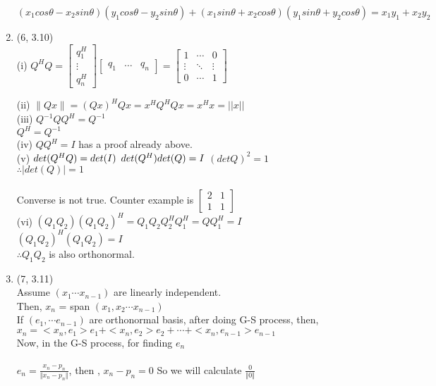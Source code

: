 \documentclass[letterpaper,12pt]{article}
\theoremstyle{definition}
\begin{document}
\begin{enumerate}
		$(x_{1}cos\theta - x_{2}sin\theta)(y_{1}cos\theta - y_{2}sin\theta)  + (x_{1}sin\theta + x_{2}cos\theta)(y_{1}sin\theta + y_{2}cos\theta) = x_{1}y_{1} + x_{2}y_{2}$




	\item (6, 3.10)\\ 
		(i) $ Q^{H}Q = \begin{bmatrix}q_{1}^{H} \\ \vdots \\ q_{n}^{H}\end{bmatrix}
					\begin{bmatrix}q_{1} & \hdots & q_{n}\end{bmatrix} = 
\begin{bmatrix}
1 & \cdots & 0 \\
\vdots & \ddots & \vdots \\
0 & \cdots & 1
\end{bmatrix}
		$
		
		(ii) $\| Qx\| = (Qx)^{H}Qx = x^{H}Q^{H}Qx = x^{H}x = || x || $ \\
	        (iii) $Q^{-1}QQ^{H} = Q^{-1}$  \\ $Q^{H}=Q^{-1}$ \\
		(iv) $QQ^{H} = I$ has a proof already above. \\
		(v) $det(Q^{H}Q) = det(I) \\$ $det(Q^{H})det(Q) = I \\$ $(detQ)^2=1$ \\ $\therefore \left|det(Q)\right| = 1  $ \\ \\
		Converse is not true. Counter example is $\begin{bmatrix}
			2 & 1 \\
			1 & 1
			\end{bmatrix}$ \\
		(vi) $(Q_{1}Q_{2})(Q_{1}Q_{2})^{H} = Q_{1}Q_{2}Q_{2}^{H}Q_{1}^{H} = QQ_{1}^{H} = I $\\
		$ (Q_{1}Q_{2})^{H}(Q_{1}Q_{2}) = I$ \\
		$\therefore Q_{1}Q_{2}$ is also orthonormal.
		

	\item (7, 3.11) \\
Assume $(x_1 \cdots x_{n-1})$ are linearly independent.
\\
Then, $x_n$ = span $(x_1, x_2 \cdots x_{n-1})$
\\
If $(e_1, \cdots e_{n-1})$ are orthonormal basis,
after doing  G-S process, then, \\
$x_n = <x_n, e_1>e_1 + <x_n, e_2>e_2 + \cdots + <x_n,e_{n-1}>e_{n-1}  $
\\
Now, in the G-S process, for finding $e_n$
\\
\\
$e_n = \frac{x_n - p_n}{\Vert x_n - p_n \Vert} $, then , $x_n - p_n = 0$
So we will calculate $\frac{0}{\Vert 0 \Vert}$




\end{enumerate}
\end{document}
